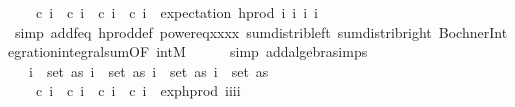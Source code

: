 \begin{isabellebody}
\ \ \ \ c\ i{}\ {\isacharasterisk}{\kern0pt}\ c\ i{}\ {\isacharasterisk}{\kern0pt}\ c\ i{}\ {\isacharasterisk}{\kern0pt}\ c\ i{}\ {\isacharasterisk}{\kern0pt}\ expectation\ {\isacharparenleft}{\kern0pt}h{\isacharunderscore}{\kern0pt}prod\ {\isacharbrackleft}{\kern0pt}i{}{\isacharcomma}{\kern0pt}\ i{}{\isacharcomma}{\kern0pt}\ i{}{\isacharcomma}{\kern0pt}\ i{}{\isacharbrackright}{\kern0pt}{\isacharparenright}{\kern0pt}{\isacharparenright}{\kern0pt}{\isacharparenright}{\kern0pt}{\isacharparenright}{\kern0pt}{\isacharparenright}{\kern0pt}{\isachardoublequoteclose}\isanewline
\ \ \ \ \isamarkupfalse%
\ {\isacharparenleft}{\kern0pt}simp\ add{\isacharcolon}{\kern0pt}f{\isacharunderscore}{\kern0pt}eq\ h{\isacharunderscore}{\kern0pt}prod{\isacharunderscore}{\kern0pt}def\ power{}{\isacharunderscore}{\kern0pt}eq{\isacharunderscore}{\kern0pt}xxxx\ sum{\isacharunderscore}{\kern0pt}distrib{\isacharunderscore}{\kern0pt}left\ sum{\isacharunderscore}{\kern0pt}distrib{\isacharunderscore}{\kern0pt}right\ Bochner{\isacharunderscore}{\kern0pt}Integration{\isachardot}{\kern0pt}integral{\isacharunderscore}{\kern0pt}sum{\isacharbrackleft}{\kern0pt}OF\ int{\isacharunderscore}{\kern0pt}M{\isacharbrackright}{\kern0pt}{\isacharparenright}{\kern0pt}\isanewline
\ \ \ \ \isamarkupfalse%
\ {\isacharparenleft}{\kern0pt}simp\ add{\isacharcolon}{\kern0pt}algebra{\isacharunderscore}{\kern0pt}simps{\isacharparenright}{\kern0pt}\isanewline
\ \ \isamarkupfalse%
\ \isamarkupfalse%
\ {\isachardoublequoteopen}{\isachardot}{\kern0pt}{\isachardot}{\kern0pt}{\isachardot}{\kern0pt}\ {\isacharequal}{\kern0pt}\ {\isacharparenleft}{\kern0pt}{\isasymSum}i{}\ {\isasymin}\ set\ as{\isachardot}{\kern0pt}\ {\isacharparenleft}{\kern0pt}{\isasymSum}i{}\ {\isasymin}\ set\ as{\isachardot}{\kern0pt}\ {\isacharparenleft}{\kern0pt}{\isasymSum}i{}\ {\isasymin}\ set\ as{\isachardot}{\kern0pt}\ {\isacharparenleft}{\kern0pt}{\isasymSum}i{}\ {\isasymin}\ set\ as{\isachardot}{\kern0pt}\ \isanewline
\ \ \ \ c\ i{}\ {\isacharasterisk}{\kern0pt}\ c\ i{}\ {\isacharasterisk}{\kern0pt}\ c\ i{}\ {\isacharasterisk}{\kern0pt}\ c\ i{}\ {\isacharasterisk}{\kern0pt}\ exp{\isacharunderscore}{\kern0pt}h{\isacharunderscore}{\kern0pt}prod\ {\isacharbrackleft}{\kern0pt}i{}{\isacharcomma}{\kern0pt}i{}{\isacharcomma}{\kern0pt}i{}{\isacharcomma}{\kern0pt}i{}{\isacharbrackright}{\kern0pt}{\isacharparenright}{\kern0pt}{\isacharparenright}{\kern0pt}{\isacharparenright}{\kern0pt}{\isacharparenright}{\kern0pt}{\isachardoublequoteclose}\isanewline

\end{isabellebody}
